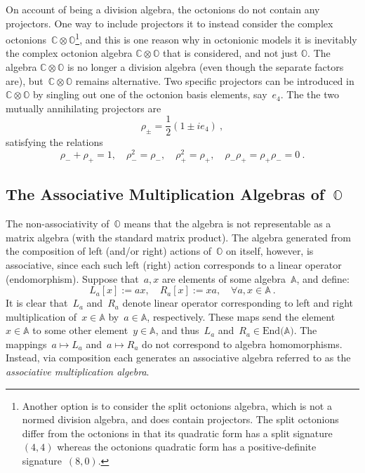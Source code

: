 \documentclass[reqno,11pt]{amsart}
\numberwithin{equation}{section}
\newcommand{\1}{\mbox{\rm 1 \hspace{-1.05 em} 1}}
\newcommand{\bb}[1]{\mathbb{#1}}
\begin{document}
On account of being a division algebra, the octonions do not contain any projectors. One way to include projectors it to instead consider the complex octonions~$\bb{C}\otimes \bb{O}$\footnote{Another option is to consider the split octonions algebra, which is not a normed division algebra, and does contain projectors. The split octonions differ from the octonions in that its quadratic form has a split signature~$(4,4)$ whereas the octonions quadratic form has a positive-definite signature~$(8,0)$.}, and this is one reason why in octonionic models it is inevitably the complex octonion algebra $\bb{C}\otimes\bb{O}$ that is considered, and not just $\bb{O}$. The algebra $\bb{C}\otimes\bb{O}$ is no longer a division algebra (even though the separate factors are), but~$\bb{C}\otimes \bb{O}$  remains alternative.  Two specific projectors can be introduced in~$\bb{C}\otimes \bb{O}$ by singling out one of the octonion basis elements, say~$e_4$. The the two mutually annihilating projectors are
\[ \rho_{\pm}=\frac{1}{2}(1 \pm ie_4) \:, \]
satisfying the relations
\[ \rho_-+\rho_+=1,\quad \rho_-^2=\rho_-,\quad \rho_+^2=\rho_+,\quad \rho_-\rho_+=\rho_+\rho_-=0 \:. \]

\subsection{The Associative Multiplication Algebras of~$\bb{O}$}

The non-associa\-ti\-vity of~$\bb{O}$ means that the algebra is not representable as a matrix algebra (with the standard matrix product). The algebra generated from the composition of left (and/or right) actions of~$\bb{O}$ on itself, however, is associative, since each such left (right) action corresponds to a linear operator (endomorphism). 
Suppose that~$a,x$ are elements of some algebra~$\bb{A}$, and define:
\[ L_a[x]:=ax,\quad R_a[x]:=xa,\quad \forall a,x\in  \bb{A} \:. \]
It is clear that~$L_a$ and~$R_a$ denote linear operator corresponding to left and right multiplication of~$x\in \bb{A}$ by~$a\in \bb{A}$, respectively. These maps send the element~$x\in\bb{A}$ to some other element~$y\in\bb{A}$, and thus~$L_a$ and~$R_a\in \text{End}(\bb{A)}$. The mappings~$a\mapsto L_a$ and~$a\mapsto R_a$ do not correspond to algebra homomorphisms. Instead, via composition each generates an associative algebra referred to as the \textit{associative multiplication algebra}.
\end{document}
